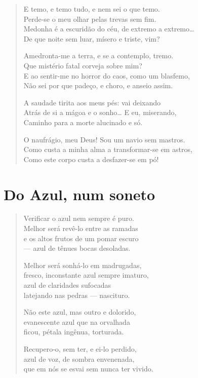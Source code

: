 \documentclass[10pt,a5paper,oneside]{book}
\begin{document}
\begin{verse}
E temo, e temo tudo, e nem sei o que temo.\\
Perde-se o meu olhar pelas trevas sem fim.\\
Medonha é a escuridão do céu, de extremo a extremo\ldots{}\\
De que noite sem luar, mísero e triste, vim?

Amedronta-me a terra, e se a contemplo, tremo.\\
Que mistério fatal corveja sobre mim?\\
E ao sentir-me no horror do caos, como um blasfemo,\\
Não sei por que padeço, e choro, e anseio assim.

A saudade tirita aos meus pés: vai deixando\\
Atrás de si a mágoa e o sonho\ldots{} E eu, miserando,\\
Caminho para a morte alucinado e só.

O naufrágio, meu Deus! Sou um navio sem mastros.\\
Como custa a minha alma a transformar-se em astros,\\
Como este corpo custa a desfazer-se em pó!
\end{verse}

\chapter{Do Azul, num soneto}

\begin{verse}
Verificar o azul nem sempre é puro.\\
Melhor será revê-lo entre as ramadas\\
e os altos frutos de um pomar escuro\\
--- azul de tênues bocas desoladas.

Melhor será sonhá-lo em madrugadas,\\
fresco, inconstante azul sempre imaturo,\\
azul de claridades sufocadas\\
latejando nas pedras --- nascituro.

Não este azul, mas outro e dolorido,\\
evanescente azul que na orvalhada\\
ficou, pétala ingênua, torturada.

Recupero-o, sem ter, e ei-lo perdido,\\
azul de voz, de sombra envenenada,\\
que em nós se esvai sem nunca ter vivido.
\end{verse}
\end{document}
